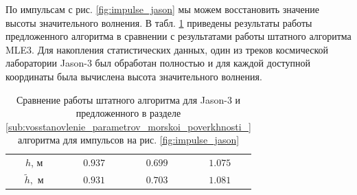 По импульсам с рис. \ref{fig:impulse_jason} мы можем восстановить значение
высоты значительного волнения. В табл. \ref{tab:real} приведены результаты
работы предложенного алгоритма в сравнении с результатами работы штатного
алгоритма MLE3. Для накопления
статистических данных, один из треков космической лаборатории Jason-3 был
обработан полностью и для каждой доступной координаты была вычислена
высота значительного волнения. 
\begin{table}[h]
    \centering
    \caption{Сравнение работы штатного алгоритма для Jason-3 и предложенного в
    разделе \ref{sub:vosstanovlenie_parametrov_morskoi_poverkhnosti_} алгоритма
для импульсов на рис. \ref{fig:impulse_jason}}
    \label{tab:real} 
    \begin{tabular}{|c|c|c|c|}
        \hline
        $h$, м      & $0.937 $ & $0.699$ & $1.075$ \\
        $\tilde h,$ м & $0.931$ & $0.703$ & $1.081$ \\
        \hline
    \end{tabular}
\end{table}

